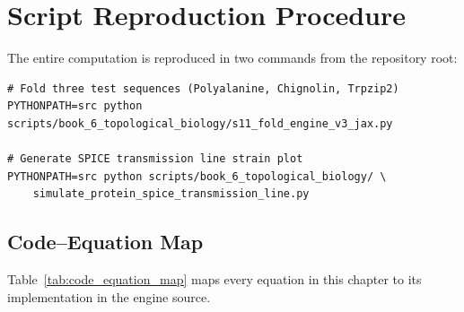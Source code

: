 \section{Script Reproduction Procedure}

The entire computation is reproduced in two commands from the repository root:

\begin{verbatim}
# Fold three test sequences (Polyalanine, Chignolin, Trpzip2)
PYTHONPATH=src python scripts/book_6_topological_biology/s11_fold_engine_v3_jax.py

# Generate SPICE transmission line strain plot
PYTHONPATH=src python scripts/book_6_topological_biology/ \
    simulate_protein_spice_transmission_line.py
\end{verbatim}

\subsection{Code--Equation Map}

Table~\ref{tab:code_equation_map} maps every equation in this chapter to its implementation in the engine source.

